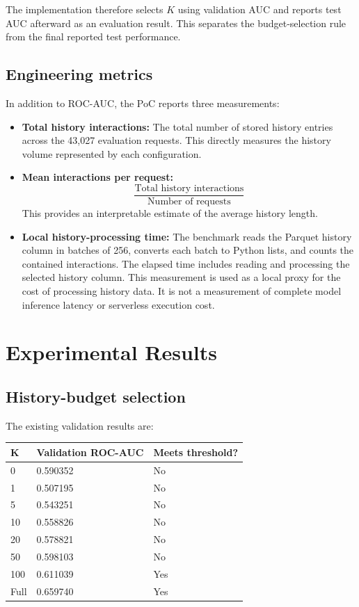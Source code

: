 \documentclass[11pt,a4paper]{article}
\begin{document}
The implementation therefore selects $K$ using validation AUC and reports test AUC afterward as an evaluation result. This separates the budget-selection rule from the final reported test performance.

\subsection{Engineering metrics}
In addition to ROC-AUC, the PoC reports three measurements:
\begin{itemize}
    \item \textbf{Total history interactions:} The total number of stored history entries across the 43,027 evaluation requests. This directly measures the history volume represented by each configuration.
    \item \textbf{Mean interactions per request:} 
    \begin{equation}
    \frac{\text{Total history interactions}}{\text{Number of requests}}
    \end{equation}
    This provides an interpretable estimate of the average history length.
    \item \textbf{Local history-processing time:} The benchmark reads the Parquet history column in batches of 256, converts each batch to Python lists, and counts the contained interactions. The elapsed time includes reading and processing the selected history column. This measurement is used as a local proxy for the cost of processing history data. It is not a measurement of complete model inference latency or serverless execution cost.
\end{itemize}

\section{Experimental Results}
\subsection{History-budget selection}
The existing validation results are:
\begin{table}[htbp]
\centering
\begin{tabular}{lll}
\toprule
\textbf{K} & \textbf{Validation ROC-AUC} & \textbf{Meets threshold?} \\
\midrule
0 & 0.590352 & No \\
1 & 0.507195 & No \\
5 & 0.543251 & No \\
10 & 0.558826 & No \\
20 & 0.578821 & No \\
50 & 0.598103 & No \\
100 & 0.611039 & Yes \\
Full & 0.659740 & Yes \\
\bottomrule
\end{tabular}
\end{table}
\end{document}
